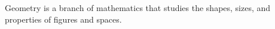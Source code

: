 \documentclass[preview]{standalone}
\begin{document}
\begin{center}
Geometry is a branch of mathematics that studies the shapes, sizes, and properties of figures and spaces.
\end{center}
\end{document}
